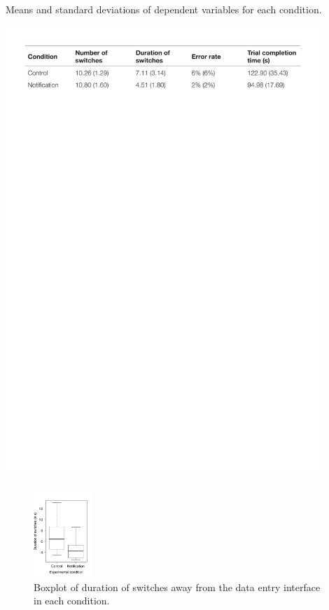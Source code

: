 \begin{table}
\caption{Means and standard deviations of dependent variables for each condition.}
\centering
\includegraphics[width=0.9\textwidth]{images/ch56/ch56-descstats.pdf}
\vspace{-3pt}
\label{tbl:ch56-Table1}
\end{table}

\begin{figure}
\centering
\includegraphics[width=0.2\textwidth]{images/ch56/ch56-Figure2.pdf}
\caption{Boxplot of duration of switches away from the data entry interface in each condition.}
\label{fig:ch56-Figure2}
\end{figure}


